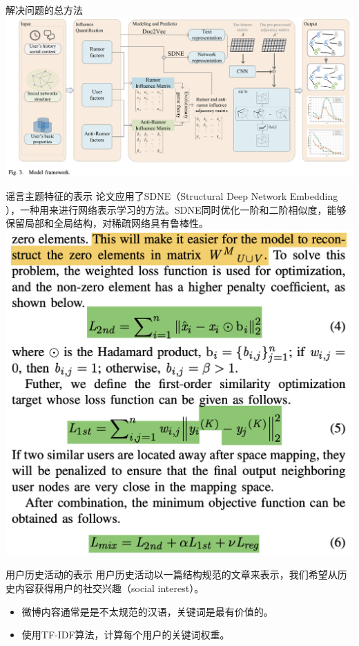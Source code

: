 \documentclass{beamer}
\begin{document}
\begin{frame}{解决问题的总方法}
	\includegraphics[width=\linewidth]{Assets/图3.png}
\end{frame}

\begin{frame}{谣言主题特征的表示}
	论文应用了SDNE（Structural Deep Network Embedding ），一种用来进行网络表示学习的方法。SDNE同时优化一阶和二阶相似度，能够保留局部和全局结构，对稀疏网络具有鲁棒性。
	\includegraphics[width=0.6\linewidth]{Assets/SDNE.png}
\end{frame}

\begin{frame}{用户历史活动的表示}
	用户历史活动以一篇结构规范的文章来表示，我们希望从历史内容获得用户的社交兴趣（social interest）。
	\begin{itemize}
		\item 微博内容通常是是不太规范的汉语，关键词是最有价值的。
		\item 使用TF-IDF算法，计算每个用户的关键词权重。
	\end{itemize}
\end{frame}
\end{document}
